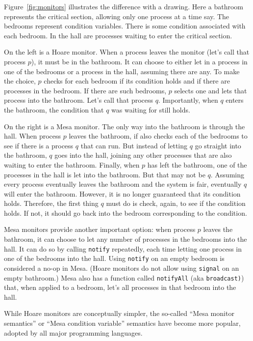 \documentclass{report}
\begin{document}
Figure~\ref{fig:monitors} illustrates the difference with a drawing.
Here a bathroom represents the critical section, allowing only one
process at a time say.  The bedrooms represent condition variables.
There is some condition associated with each bedroom.
In the hall are processes waiting to enter the critical section.

On the left is a Hoare monitor.  When a process leaves the monitor
(let's call that process $p$), it must be in the bathroom.
It can choose to either let in a process
in one of the bedrooms or a process in the hall, assuming there are any.
To make the choice, $p$ checks for each bedroom if its condition holds
and if there are processes in the bedroom.
If there are such bedrooms, $p$ selects one and lets that process into
the bathroom.  Let's call that process $q$.  Importantly, when $q$ enters
the bathroom, the condition that $q$ was waiting for still holds.

On the right is a Mesa monitor.  The only way into the bathroom is through
the hall.  When process $p$ leaves the bathroom,
if also checks each of the bedrooms to see if there is a process $q$ that
can run.  But instead of letting $q$ go straight into the bathroom, $q$
goes into the hall, joining any other processes that are also waiting to
enter the bathroom.  Finally, when $p$ has left the bathroom, one of the
processes in the hall is let into the bathroom.  But that may not be $q$.
Assuming every process eventually leaves the bathroom and the system is
fair, eventually $q$ will enter the bathroom.  However, it is no longer
guaranteed that its condition holds.  Therefore, the first thing $q$ must
do is check, again, to see if the condition holds.  If not, it should go back
into the bedroom corresponding to the condition.

Mesa monitors provide another important option:
when process $p$ leaves the bathroom, it can choose to let any number of
processes in the bedrooms into the hall.  It can do so by calling
\texttt{notify} repeatedly, each time letting one process in one of the
bedrooms into the hall.  Using \texttt{notify} on an empty
bedroom is considered a no-op in Mesa.  (Hoare monitors do not allow
using \texttt{signal} on an empty bathroom.) Mesa also has a function called
\texttt{notifyAll}
(aka \texttt{broadcast)})
that, when applied to
a bedroom, let's all processes in that bedroom into the hall.

While Hoare monitors are conceptually simpler, the so-called
``Mesa monitor semantics'' or ``Mesa condition variable'' semantics
have become more popular, adopted by all major
programming languages.
\end{document}
